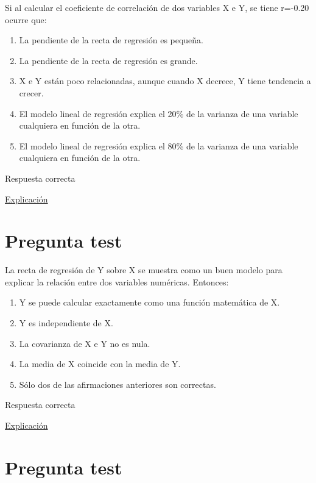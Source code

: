 \documentclass[
]{book}
\providecommand{\tightlist}{%
  \setlength{\itemsep}{0pt}\setlength{\parskip}{0pt}}
\begin{document}
Si al calcular el coeficiente de correlación de dos variables X e Y, se tiene r=-0.20 ocurre que:

\begin{enumerate}
\def\labelenumi{\alph{enumi})}
\tightlist
\item
  La pendiente de la recta de regresión es pequeña.
\item
  La pendiente de la recta de regresión es grande.
\item
  X e Y están poco relacionadas, aunque cuando X decrece, Y tiene tendencia a crecer.
\item
  El modelo lineal de regresión explica el 20\% de la varianza de una variable cualquiera en función de la otra.
\item
  El modelo lineal de regresión explica el 80\% de la varianza de una variable cualquiera en función de la otra.
\end{enumerate}

Respuesta correcta

\href{https://1fjmanzano.github.io/bioestadistica/relaci\%C3\%B3n-entre-variables-nume\%CC\%81ricas.html}{Explicación}

\hypertarget{pregunta-test-122}{%
\section{Pregunta test}\label{pregunta-test-122}}

La recta de regresión de Y sobre X se muestra como un buen modelo para explicar la relación entre dos variables numéricas. Entonces:

\begin{enumerate}
\def\labelenumi{\alph{enumi})}
\tightlist
\item
  Y se puede calcular exactamente como una función matemática de X.
\item
  Y es independiente de X.
\item
  La covarianza de X e Y no es nula.
\item
  La media de X coincide con la media de Y.
\item
  Sólo dos de las afirmaciones anteriores son correctas.
\end{enumerate}

Respuesta correcta

\href{https://1fjmanzano.github.io/bioestadistica/relaci\%C3\%B3n-entre-variables-nume\%CC\%81ricas.html\#covarianza}{Explicación}

\hypertarget{pregunta-test-123}{%
\section{Pregunta test}\label{pregunta-test-123}}
\end{document}
